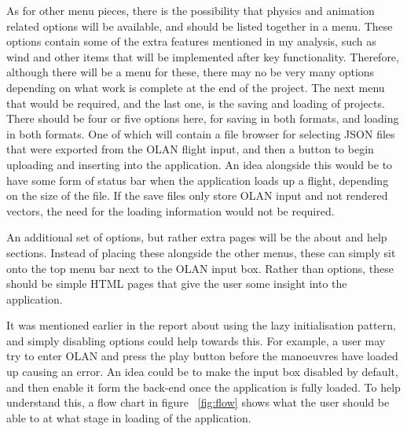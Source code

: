 As for other menu pieces, there is the possibility that physics and animation related options will be available, and should be listed together in a menu. These options contain some of the extra features mentioned in my analysis, such as wind and other items that will be implemented after key functionality. Therefore, although there will be a menu for these, there may no be very many options depending on what work is complete at the end of the project. The next menu that would be required, and the last one, is the saving and loading of projects. There should be four or five options here, for saving in both formats, and loading in both formats. One of which will contain a file browser for selecting JSON files that were exported from the OLAN flight input, and then a button to begin uploading and inserting into the application. An idea alongside this would be to have some form of status bar when the application loads up a flight, depending on the size of the file. If the save files only store OLAN input and not rendered vectors, the need for the loading information would not be required.

An additional set of options, but rather extra pages will be the about and help sections. Instead of placing these alongside the other menus, these can simply sit onto the top menu bar next to the OLAN input box. Rather than options, these should be simple HTML pages that give the user some insight into the application.

It was mentioned earlier in the report about using the lazy initialisation pattern, and simply disabling options could help towards this. For example, a user may try to enter OLAN and press the play button before the manoeuvres have loaded up causing an error. An idea could be to make the input box disabled by default, and then enable it form the back-end once the application is fully loaded. To help understand this, a flow chart in figure ~\ref{fig:flow} shows what the user should be able to at what stage in loading of the application. 

\clearpage

